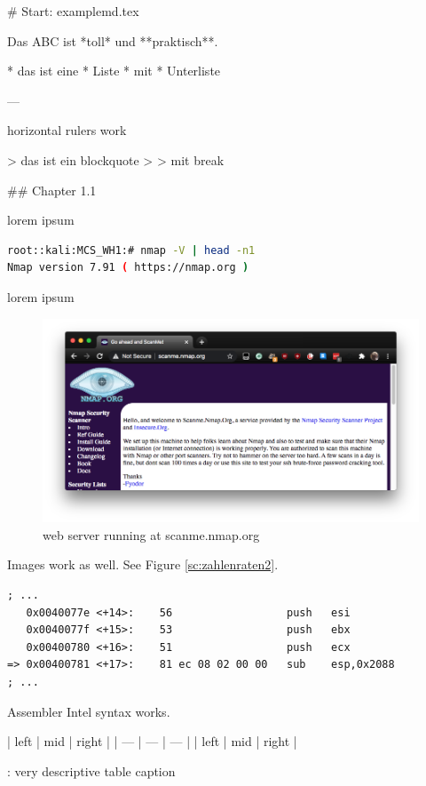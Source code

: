 \begin{markdown}

# Start: example\underscore md.tex

Das \ac{ABC} ist *toll* und **praktisch**.

* das ist eine
* Liste
    * mit
    * Unterliste

---

horizontal rulers work

> das ist ein blockquote
>
> mit break

## Chapter 1.1

lorem ipsum
\newline
\end{markdown} %
\begin{lstlisting}[language=sh,name={checking Nmap's version},label={sc:nmapversion}]
root::kali:MCS_WH1:# nmap -V | head -n1
Nmap version 7.91 ( https://nmap.org )
\end{lstlisting}
\begin{markdown}

lorem ipsum

\begin{figure}[!htbp]
\centering
\includegraphics[width=1.05\linewidth]{media/scanme.nmap.org.png}
\caption{web server running at scanme.nmap.org}\label{webserver}
\end{figure}

Images work as well. See Figure \ref{sc:zahlenraten2}.
\newline
\end{markdown} %
\begin{lstlisting}[language={[x86masm]Assembler},name={disassembly of `zahlenraten`},label={sc:zahlenraten2}]
; ...
   0x0040077e <+14>:    56                  push   esi
   0x0040077f <+15>:    53                  push   ebx
   0x00400780 <+16>:    51                  push   ecx
=> 0x00400781 <+17>:    81 ec 08 02 00 00   sub    esp,0x2088
; ...
\end{lstlisting}
\begin{markdown}

Assembler Intel syntax works.

| left | mid | right |
| ---  | --- | ---   |
| left | mid | right |

: very descriptive table caption

\end{markdown}
